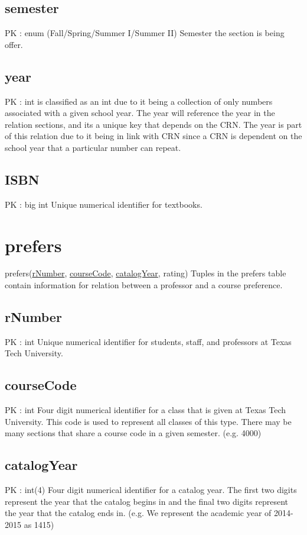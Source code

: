 	\subsection{semester}
		PK : enum (Fall/Spring/Summer I/Summer II)
		Semester the section is being offer.
		
	\subsection{year}
		PK : int 
		is classified as an int due to it being a collection of only numbers associated with a given school year. The year will reference the year in the relation sections, and its a unique key that depends on the CRN. The year is part of this relation due to it being in link with CRN since a CRN is dependent on the school year that a particular number can 	repeat.
	
	\subsection{ISBN}
 		PK : big int  
 		Unique numerical identifier for textbooks.
	
	
\section{prefers}
	prefers(\underline{rNumber}, \underline{courseCode}, \underline{catalogYear}, rating) 
		Tuples in the prefers table contain information for relation between a professor and a course preference.
	
	\subsection{rNumber}
		PK : int 
		Unique numerical identifier for students, staff, and professors at Texas Tech University.
	
	\subsection{courseCode}
		PK : int
		Four digit numerical identifier for a class that is given at Texas Tech University. This code is used to represent all classes of this type. There may be many sections that share a course code in a given semester. (e.g. 4000)
	
	\subsection{catalogYear}
		PK : int(4) 
		Four digit numerical identifier for a catalog year. The first two digits represent the year that the catalog begins in and the final two digits represent the year that the catalog ends in. (e.g. We represent the academic year of 2014-2015 as 1415)
	
